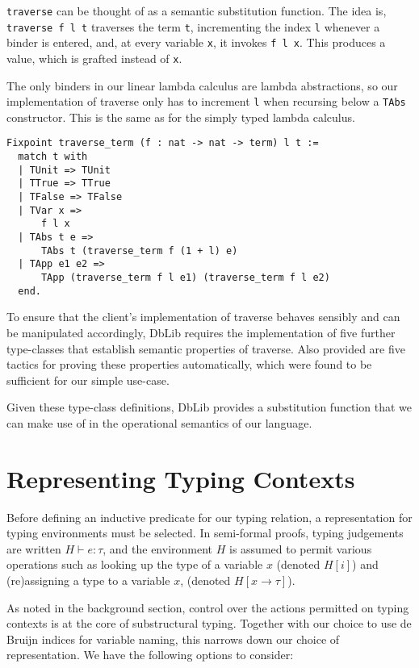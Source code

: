 \documentclass[]{unswthesis}
\let\c\texttt
\begin{document}
\begin{displayquote}
\c{traverse} can be thought of as a semantic substitution function. The idea is, \c{traverse f l t} traverses the term \c{t}, incrementing the index \c{l} whenever a binder is entered, and, at every variable \c{x}, it invokes \c{f l x}. This produces a value, which is grafted instead of \c{x}.
\end{displayquote}

The only binders in our linear lambda calculus are lambda abstractions, so our implementation of traverse only has to increment \c{l} when recursing below a \c{TAbs} constructor. This is the same as for the simply typed lambda calculus.

\begin{verbatim}
Fixpoint traverse_term (f : nat -> nat -> term) l t :=
  match t with
  | TUnit => TUnit
  | TTrue => TTrue
  | TFalse => TFalse
  | TVar x =>
      f l x
  | TAbs t e =>
      TAbs t (traverse_term f (1 + l) e)
  | TApp e1 e2 =>
      TApp (traverse_term f l e1) (traverse_term f l e2)
  end.
\end{verbatim}

To ensure that the client's implementation of traverse behaves sensibly and can be manipulated accordingly, DbLib requires the implementation of five further type-classes that establish semantic properties of traverse. Also provided are five tactics for proving these properties automatically, which were found to be sufficient for our simple use-case.

Given these type-class definitions, DbLib provides a substitution function that we can make use of in the operational semantics of our language.

\section{Representing Typing Contexts}

Before defining an inductive predicate for our typing relation, a representation for typing environments must be selected. In semi-formal proofs, typing judgements are written $H \vdash e : \tau$, and the environment $H$ is assumed to permit various operations such as looking up the type of a variable $x$ (denoted $H[i]$) and (re)assigning a type to a variable $x$, (denoted $H[x \to \tau]$).

As noted in the background section, control over the actions permitted on typing contexts is at the core of substructural typing. Together with our choice to use de Bruijn indices for variable naming, this narrows down our choice of representation. We have the following options to consider:
\end{document}
